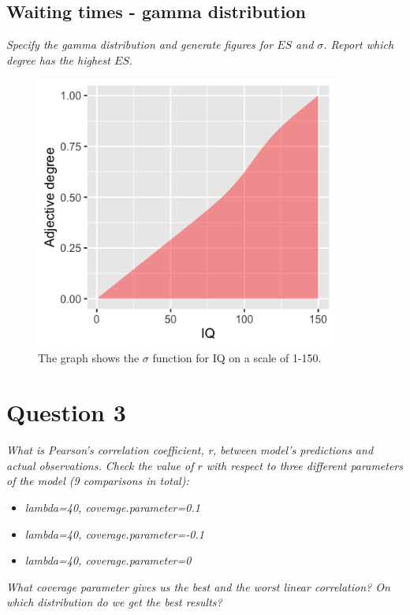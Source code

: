 \documentclass[11pt,a4paper,oneside]{article}
\begin{document}
\subsection{Waiting times - gamma distribution}
\textit{Specify the gamma distribution and generate figures for $ES$ and $\sigma$. Report which degree has the highest $ES$.}\\

\begin{figure}[H]
    \centering
    \includegraphics[width=100mm]{figs/Question_2_IQ_sigma.png}
    \caption{The graph shows the $\sigma$ function for IQ on a scale of 1-150.}
  \label{fig:q2_iq_sigma}
\end{figure}

\section{Question 3}
\label{Q3}
\textit{What is Pearson’s correlation coefficient, r, between model’s predictions and actual observations. Check the value of $r$ with respect to three different parameters of the model (9 comparisons in total):}

\begin{itemize}
    \item \textit{lambda=40, coverage.parameter=0.1}
    \item \textit{lambda=40, coverage.parameter=-0.1}
    \item \textit{lambda=40, coverage.parameter=0}
\end{itemize}

\textit{What coverage parameter gives us the best and the worst linear correlation? On which distribution do we get the best results?}
\end{document}
